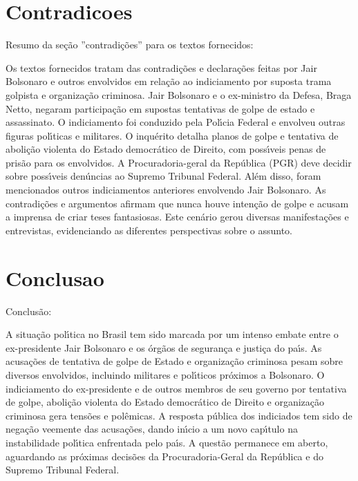\documentclass[article,11pt,oneside,a4paper,brazil,sumario=tradicional]{abntex2}%
\begin{document}
%
\section{Contradicoes}%
\label{sec:Contradicoes}%
Resumo da se\c{c}\~ao ''contradi\c{c}\~oes'' para os textos fornecidos:

Os textos fornecidos tratam das contradi\c{c}\~oes e declara\c{c}\~oes feitas por Jair Bolsonaro e outros envolvidos em rela\c{c}\~ao ao indiciamento por suposta trama golpista e organiza\c{c}\~ao criminosa. Jair Bolsonaro e o ex-ministro da Defesa, Braga Netto, negaram participa\c{c}\~ao em supostas tentativas de golpe de estado e assassinato. O indiciamento foi conduzido pela Pol{\'\i}cia Federal e envolveu outras figuras pol{\'\i}ticas e militares. O inqu\'erito detalha planos de golpe e tentativa de aboli\c{c}\~ao violenta do Estado democr\'atico de Direito, com poss{\'\i}veis penas de pris\~ao para os envolvidos. A Procuradoria-geral da Rep\'ublica (PGR) deve decidir sobre poss{\'\i}veis den\'uncias ao Supremo Tribunal Federal. Al\'em disso, foram mencionados outros indiciamentos anteriores envolvendo Jair Bolsonaro. As contradi\c{c}\~oes e argumentos afirmam que nunca houve inten\c{c}\~ao de golpe e acusam a imprensa de criar teses fantasiosas. Este cen\'ario gerou diversas manifesta\c{c}\~oes e entrevistas, evidenciando as diferentes perspectivas sobre o assunto.

%
\section{Conclusao}%
\label{sec:Conclusao}%
Conclus\~ao:

A situa\c{c}\~ao pol{\'\i}tica no Brasil tem sido marcada por um intenso embate entre o ex-presidente Jair Bolsonaro e os \'org\~aos de seguran\c{c}a e justi\c{c}a do pa{\'\i}s. As acusa\c{c}\~oes de tentativa de golpe de Estado e organiza\c{c}\~ao criminosa pesam sobre diversos envolvidos, incluindo militares e pol{\'\i}ticos pr\'oximos a Bolsonaro. O indiciamento do ex-presidente e de outros membros de seu governo por tentativa de golpe, aboli\c{c}\~ao violenta do Estado democr\'atico de Direito e organiza\c{c}\~ao criminosa gera tens\~oes e pol\^emicas. A resposta p\'ublica dos indiciados tem sido de nega\c{c}\~ao veemente das acusa\c{c}\~oes, dando in{\'\i}cio a um novo cap{\'\i}tulo na instabilidade pol{\'\i}tica enfrentada pelo pa{\'\i}s. A quest\~ao permanece em aberto, aguardando as pr\'oximas decis\~oes da Procuradoria-Geral da Rep\'ublica e do Supremo Tribunal Federal.

%
%
\end{document}
